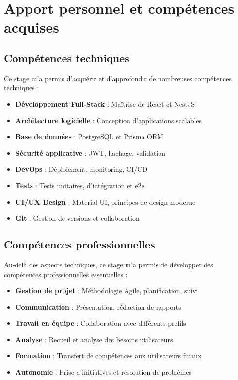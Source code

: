 \section*{Apport personnel et compétences acquises}

\subsection*{Compétences techniques}

Ce stage m'a permis d'acquérir et d'approfondir de nombreuses compétences techniques :

\begin{itemize}
    \item \textbf{Développement Full-Stack} : Maîtrise de React et NestJS
    \item \textbf{Architecture logicielle} : Conception d'applications scalables
    \item \textbf{Base de données} : PostgreSQL et Prisma ORM
    \item \textbf{Sécurité applicative} : JWT, hachage, validation
    \item \textbf{DevOps} : Déploiement, monitoring, CI/CD
    \item \textbf{Tests} : Tests unitaires, d'intégration et e2e
    \item \textbf{UI/UX Design} : Material-UI, principes de design moderne
    \item \textbf{Git} : Gestion de versions et collaboration
\end{itemize}

\subsection*{Compétences professionnelles}

Au-delà des aspects techniques, ce stage m'a permis de développer des compétences professionnelles essentielles :

\begin{itemize}
    \item \textbf{Gestion de projet} : Méthodologie Agile, planification, suivi
    \item \textbf{Communication} : Présentation, rédaction de rapports
    \item \textbf{Travail en équipe} : Collaboration avec différents profils
    \item \textbf{Analyse} : Recueil et analyse des besoins utilisateurs
    \item \textbf{Formation} : Transfert de compétences aux utilisateurs finaux
    \item \textbf{Autonomie} : Prise d'initiatives et résolution de problèmes
\end{itemize}

